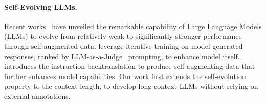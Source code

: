 
\paragraph{Self-Evolving LLMs.} 
Recent works~\citep{Yuan2024SelfRewardingLM,liu2024directlargelanguagemodel,li2024selfalignmentinstructionbacktranslation} have unveiled the remarkable capability of Large Language Models (LLMs) to evolve from relatively weak to significantly stronger performance through self-augmented data. \citet{Yuan2024SelfRewardingLM, liu2024directlargelanguagemodel}  leverage iterative training on model-generated responses, ranked by LLM-as-a-Judge~\citep{Zheng2023JudgingLW} prompting, to enhance model itself. \citet{li2024selfalignmentinstructionbacktranslation} introduces the instruction backtranslation to produce self-augmenting data that further enhances model capabilities. Our work first extends the self-evolution property to the context length, to develop long-context LLMs without relying on external annotations.


